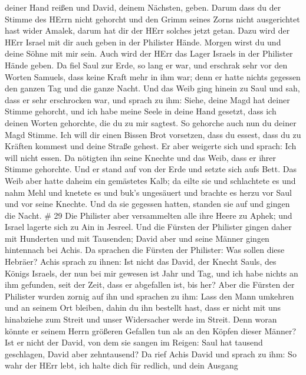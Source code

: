 deiner Hand reißen und David, deinem Nächsten, geben. 
Darum dass du der Stimme des HErrn nicht gehorcht und den Grimm seines
Zorns nicht ausgerichtet hast wider Amalek, darum hat dir der HErr
solches jetzt getan.  Dazu wird der HErr Israel mit dir
auch geben in der Philister Hände. Morgen wirst du und deine Söhne mit
mir sein. Auch wird der HErr das Lager Israels in der Philister Hände
geben.  Da fiel Saul zur Erde, so lang er war, und erschrak
sehr vor den Worten Samuels, dass keine Kraft mehr in ihm war; denn er
hatte nichts gegessen den ganzen Tag und die ganze Nacht. 
Und das Weib ging hinein zu Saul und sah, dass er sehr erschrocken war,
und sprach zu ihm: Siehe, deine Magd hat deiner Stimme gehorcht, und ich
habe meine Seele in deine Hand gesetzt, dass ich deinen Worten
gehorchte, die du zu mir sagtest.  So gehorche auch nun du
deiner Magd Stimme. Ich will dir einen Bissen Brot vorsetzen, dass du
essest, dass du zu Kräften kommest und deine Straße gehest.
 Er aber weigerte sich und sprach: Ich will nicht essen. Da
nötigten ihn seine Knechte und das Weib, dass er ihrer Stimme gehorchte.
Und er stand auf von der Erde und setzte sich aufs Bett. 
Das Weib aber hatte daheim ein gemästetes Kalb; da eilte sie und
schlachtete es und nahm Mehl und knetete es und buk's ungesäuert
 und brachte es herzu vor Saul und vor seine Knechte. Und
da sie gegessen hatten, standen sie auf und gingen die Nacht. \# 29
 Die Philister aber versammelten alle ihre Heere zu Aphek;
und Israel lagerte sich zu Ain in Jesreel.  Und die Fürsten
der Philister gingen daher mit Hunderten und mit Tausenden; David aber
und seine Männer gingen hintennach bei Achis.  Da sprachen
die Fürsten der Philister: Was sollen diese Hebräer? Achis sprach zu
ihnen: Ist nicht das David, der Knecht Sauls, des Königs Israels, der
nun bei mir gewesen ist Jahr und Tag, und ich habe nichts an ihm
gefunden, seit der Zeit, dass er abgefallen ist, bis her? 
Aber die Fürsten der Philister wurden zornig auf ihn und sprachen zu
ihm: Lass den Mann umkehren und an seinem Ort bleiben, dahin du ihn
bestellt hast, dass er nicht mit uns hinabziehe zum Streit und unser
Widersacher werde im Streit. Denn woran könnte er seinem Herrn größeren
Gefallen tun als an den Köpfen dieser Männer?  Ist er nicht
der David, von dem sie sangen im Reigen: Saul hat tausend geschlagen,
David aber zehntausend?  Da rief Achis David und sprach zu
ihm: So wahr der HErr lebt, ich halte dich für redlich, und dein Ausgang
